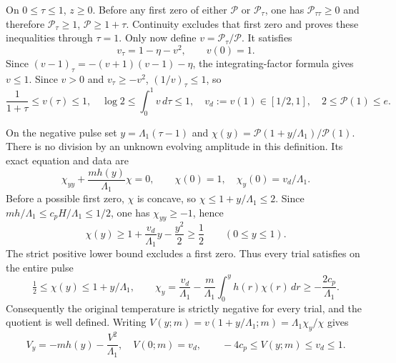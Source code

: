 On $0\leq\tau\leq1$, $z\geq0$. Before any first zero of either
$\mathcal P$ or $\mathcal P_\tau$, one has
$\mathcal P_{\tau\tau}\geq0$ and therefore
$\mathcal P_\tau\geq1$, $\mathcal P\geq1+\tau$.
Continuity excludes that first zero and proves these inequalities
through $\tau=1$. Only now define $v=\mathcal P_\tau/\mathcal P$.
It satisfies
\[
 v_\tau=1-\eta-v^2,\qquad v(0)=1.
\]
Since $(v-1)_\tau=-(v+1)(v-1)-\eta$, the integrating-factor formula
gives $v\leq1$. Since $v>0$ and $v_\tau\geq-v^2$,
$(1/v)_\tau\leq1$, so
\begin{equation}
 \frac1{1+\tau}\leq v(\tau)\leq1,\quad
 \log2\leq\int_0^1v\,d\tau\leq1,\quad
 v_d:=v(1)\in[1/2,1],\quad 2\leq\mathcal P(1)\leq e.
 \label{eq:cv-first-ramp}
\end{equation}

On the negative pulse set $y=\Lambda_1(\tau-1)$ and
$\chi(y)=\mathcal P(1+y/\Lambda_1)/\mathcal P(1)$.
There is no division by an unknown evolving amplitude in this
definition. Its exact equation and data are
\begin{equation}
 \chi_{yy}+\frac{mh(y)}{\Lambda_1}\chi=0,\qquad
 \chi(0)=1,\quad\chi_y(0)=v_d/\Lambda_1.
 \label{eq:cv-first-chi}
\end{equation}
Before a possible first zero, $\chi$ is concave, so
$\chi\leq1+y/\Lambda_1\leq2$. Since
$mh/\Lambda_1\leq c_pH/\Lambda_1\leq1/2$, one has
$\chi_{yy}\geq-1$, hence
\[
 \chi(y)\geq1+\frac{v_d}{\Lambda_1}y-\frac{y^2}{2}\geq\frac12
 \qquad(0\leq y\leq1).
\]
The strict positive lower bound excludes a first zero. Thus every
trial satisfies on the entire pulse
\begin{equation}
 \tfrac12\leq\chi(y)\leq1+y/\Lambda_1,\qquad
 \chi_y=\frac{v_d}{\Lambda_1}
  -\frac m{\Lambda_1}\int_0^yh(r)\chi(r)\,dr
  \geq-\frac{2c_p}{\Lambda_1}.
 \label{eq:cv-first-trial-positive}
\end{equation}
Consequently the original temperature is strictly negative for every
trial, and the quotient is well defined. Writing
$V(y;m)=v(1+y/\Lambda_1;m)=\Lambda_1\chi_y/\chi$ gives
\begin{equation}
 V_y=-mh(y)-\frac{V^2}{\Lambda_1},\quad V(0;m)=v_d,
 \qquad -4c_p\leq V(y;m)\leq v_d\leq1.
 \label{eq:cv-first-exact-riccati}
\end{equation}

